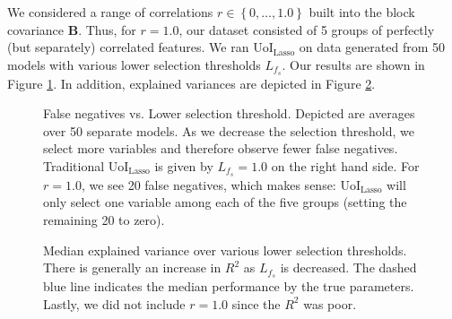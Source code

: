 \documentclass[11pt]{article}
\begin{document}
	We considered a range of correlations $r\in \left\{0, \ldots, 1.0\right\}$ built into the block covariance $\mathbf{B}$. Thus, for $r=1.0$, our dataset consisted of 5 groups of perfectly (but separately) correlated features. We ran UoI$_{\text{Lasso}}$ on data generated from 50 models with various lower selection thresholds $L_{f_s}$. Our results are shown in Figure \ref{fig:fn-vs-thres}. 	In addition, explained variances are depicted in Figure \ref{fig:r2-vs-thres}.
	\begin{figure}[ht]
		\centering
		\caption{False negatives vs. Lower selection threshold. Depicted are averages over 50 separate models. As we decrease the selection threshold, we select more variables and therefore observe fewer false negatives. Traditional UoI$_{\text{Lasso}}$ is given by $L_{f_s} = 1.0$ on the right hand side. For $r=1.0$, we see 20 false negatives, which makes sense: UoI$_{\text{Lasso}}$ will only select one variable among each of the five groups (setting the remaining 20 to zero).}
		\label{fig:fn-vs-thres}
	\end{figure}
	\begin{figure}[ht]
		\centering
		\caption{Median explained variance over various lower selection thresholds. There is generally an increase in $R^2$ as $L_{f_s}$ is decreased. The dashed blue line indicates the median performance by the true parameters. Lastly, we did not include $r=1.0$ since the $R^2$ was poor.}
		\label{fig:r2-vs-thres}
	\end{figure}
\end{document}
